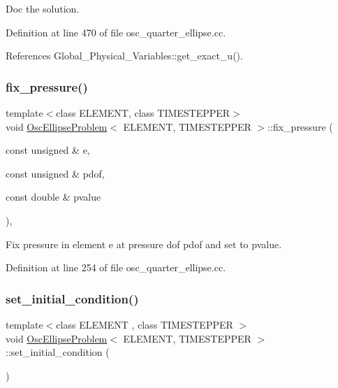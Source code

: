 Doc the solution. 



Definition at line 470 of file osc\+\_\+quarter\+\_\+ellipse.\+cc.



References Global\+\_\+\+Physical\+\_\+\+Variables\+::get\+\_\+exact\+\_\+u().

\mbox{\label{classOscEllipseProblem_a8b70831d1c25a40c814d5d92e77a1085}} 
\subsubsection{\texorpdfstring{fix\+\_\+pressure()}{fix\_pressure()}}
{\footnotesize\ttfamily template$<$class E\+L\+E\+M\+E\+NT, class T\+I\+M\+E\+S\+T\+E\+P\+P\+ER$>$ \\
void \hyperlink{classOscEllipseProblem}{Osc\+Ellipse\+Problem}$<$ E\+L\+E\+M\+E\+NT, T\+I\+M\+E\+S\+T\+E\+P\+P\+ER $>$\+::fix\+\_\+pressure (\begin{DoxyParamCaption}\item[{const unsigned \&}]{e,  }\item[{const unsigned \&}]{pdof,  }\item[{const double \&}]{pvalue }\end{DoxyParamCaption})\hspace{0.3cm}{\ttfamily [inline]}, {\ttfamily [private]}}



Fix pressure in element e at pressure dof pdof and set to pvalue. 



Definition at line 254 of file osc\+\_\+quarter\+\_\+ellipse.\+cc.

\mbox{\label{classOscEllipseProblem_ae638f238a7b0e0acb5d6087b7363fe01}} 
\subsubsection{\texorpdfstring{set\+\_\+initial\+\_\+condition()}{set\_initial\_condition()}}
{\footnotesize\ttfamily template$<$class E\+L\+E\+M\+E\+NT , class T\+I\+M\+E\+S\+T\+E\+P\+P\+ER $>$ \\
void \hyperlink{classOscEllipseProblem}{Osc\+Ellipse\+Problem}$<$ E\+L\+E\+M\+E\+NT, T\+I\+M\+E\+S\+T\+E\+P\+P\+ER $>$\+::set\+\_\+initial\+\_\+condition (\begin{DoxyParamCaption}{ }\end{DoxyParamCaption})}



